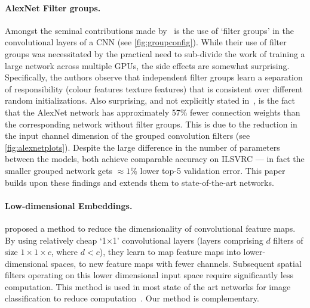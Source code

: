 \documentclass[thesis]{subfiles}
\begin{document}
	\paragraph{AlexNet Filter groups.} Amongst the seminal contributions made by \citet{Krizhevsky2012}~is the use of `filter groups' in the convolutional layers of a CNN (see \cref{fig:groupconfig}). While their use of filter groups was necessitated by the practical need to sub-divide the work of training a large network across multiple GPUs, the side effects are somewhat surprising. Specifically, the authors observe that independent filter groups learn a separation of responsibility (colour features \vs{}texture features) that is consistent over different random initializations. Also surprising, and not explicitly stated in~\citep{Krizhevsky2012}, is the fact that the AlexNet network has approximately 57\% fewer connection weights than the corresponding network without filter groups. This is due to the reduction in the input channel dimension of the grouped convolution filters (see \cref{fig:alexnetplots}).
	Despite the large difference in the number of parameters between the models, both achieve comparable accuracy on ILSVRC --- in fact the smaller grouped network gets $\approx1$\% lower top-5 validation error. This paper builds upon these findings and extends them to state-of-the-art networks.
	
	\paragraph{Low-dimensional Embeddings.}
	\citet{Lin2013NiN} proposed a method to reduce the dimensionality of convolutional feature maps. 
	By using relatively cheap `1$\times$1' convolutional layers (\ie{}layers comprising $d$ filters of size $1\times 1 \times c$, where $d<c$), they learn to map feature maps into lower-dimensional spaces, \ie to new feature maps with fewer channels. Subsequent spatial filters operating on this lower dimensional input space require significantly less computation. This method is used in most state of the art networks for image classification to reduce computation~\citep{Szegedy2014going,He2015}. Our method is complementary.
	
\end{document}
